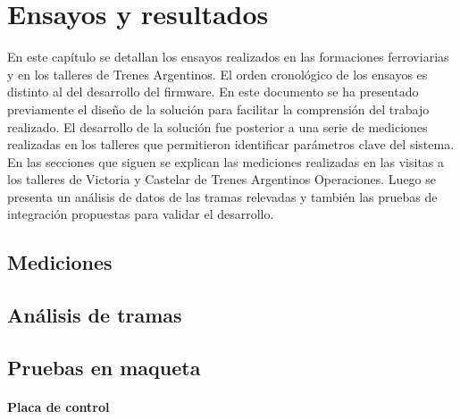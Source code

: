 
\chapter{Ensayos y resultados} %
En este capítulo se detallan los ensayos realizados en las formaciones ferroviarias y en los talleres de Trenes Argentinos. El orden cronológico de los ensayos es distinto al del desarrollo del firmware. En este documento se ha presentado previamente el diseño de la solución para facilitar la comprensión del trabajo realizado. El desarrollo de la solución fue posterior a una serie de mediciones realizadas en los talleres que permitieron identificar parámetros clave del sistema. \\

En las secciones que siguen se explican las mediciones realizadas en las visitas a los talleres de Victoria y Castelar de Trenes Argentinos Operaciones. Luego se presenta un análisis de datos de las tramas relevadas y también las pruebas de integración propuestas para validar el desarrollo. \\


\label{Chapter4} %


\section{Mediciones}

\section{Análisis de tramas}

\section{Pruebas en maqueta}

\subsubsection{Placa de control}

